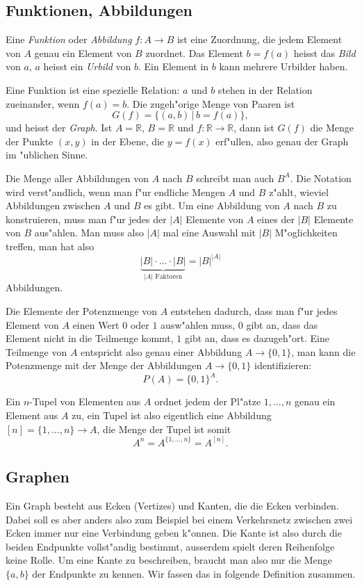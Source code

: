 \subsection{Funktionen, Abbildungen}
Eine {\em Funktion} oder {\em Abbildung} $f\colon A\to B$ ist
eine Zuordnung, die
jedem Element von $A$ genau ein Element von $B$ zuordnet.
Das Element
$b=f(a)$ heisst das {\em Bild} von $a$, $a$ heisst ein {\em Urbild} von $b$. Ein
Element in $b$ kann mehrere Urbilder haben.

Eine Funktion ist eine spezielle Relation: 
$a$  und $b$ stehen in der Relation zueinander, wenn $f(a)=b$. 
Die zugeh"orige Menge von Paaren ist
\[
G(f)=\{(a,b)\,|\,b=f(a)\},
\]
und heisst der {\em Graph}. Ist $A=\mathbb R$, $B=\mathbb R$ und
$f\colon\mathbb R\to\mathbb R$, dann ist $G(f)$ die Menge
der Punkte $(x,y)$ in der Ebene, die $y=f(x)$ erf"ullen, also
genau der Graph im "ublichen Sinne.

Die Menge aller Abbildungen von $A$ nach $B$ schreibt man auch
$B^A$. Die Notation wird verst"andlich, wenn man f"ur endliche
Mengen $A$ und $B$ z"ahlt, wieviel
Abbildungen zwischen $A$ und $B$ es gibt. Um eine Abbildung von
$A$ nach $B$ zu konstruieren, muss man f"ur jedes der $|A|$ Elemente von $A$
eines der $|B|$ Elemente von $B$ aus"ahlen. Man muss also $|A|$ mal
eine Auswahl mit $|B|$ M"oglichkeiten treffen, man hat also
\[
\underbrace{|B|\cdot\dots\cdot|B|}_{\text{$|A|$ Faktoren}}=|B|^{|A|}
\]
Abbildungen.

Die Elemente der Potenzmenge von $A$ entstehen dadurch, dass man f"ur jedes
Element von $A$ einen Wert $0$ oder $1$ ausw"ahlen muss, $0$ gibt an,
dass das Element nicht in die Teilmenge kommt, $1$ gibt an, dass es dazugeh"ort.
Eine Teilmenge von $A$ entspricht also genau einer Abbildung $A\to\{0,1\}$,
man kann die Potenzmenge mit der Menge der Abbildungen $A\to\{0,1\}$
identifizieren:
\[
P(A) = \{0,1\}^{A}.
\]

Ein $n$-Tupel von Elementen aus $A$ ordnet jedem der Pl"atze
$1,\dots,n$ genau ein Element aus $A$ zu, ein Tupel ist also eigentlich
eine Abbildung $[n]=\{1,\dots,n\}\to A$, die Menge der Tupel ist somit
\[
A^n=A^{\{1,\dots,n\}}=A^{[n]}.
\]

\subsection{Graphen}
Ein Graph besteht aus Ecken (Vertizes) und Kanten,
die die Ecken verbinden.
Dabei
soll es aber anders also zum Beispiel bei einem Verkehrsnetz zwischen zwei
Ecken immer nur eine Verbindung geben k"onnen. Die Kante ist also durch
die beiden Endpunkte vollst"andig bestimmt, ausserdem spielt deren
Reihenfolge keine Rolle. Um eine Kante zu beschreiben, braucht man
also nur die Menge $\{a,b\}$ der Endpunkte zu kennen.
Wir fassen das in folgende Definition zusammen.

